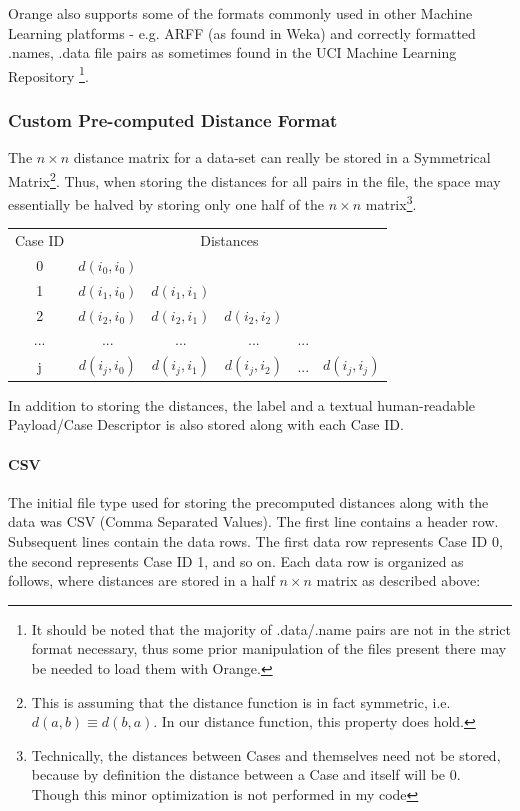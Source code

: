 \documentclass[a4paper,11pt]{report}
\begin{document}
Orange also supports some of the formats commonly used in other Machine Learning platforms - e.g. ARFF (as found in Weka) and correctly formatted .names, .data file pairs as sometimes found in the UCI Machine Learning Repository \citep{web:uci}\footnote{It should be noted that the majority of .data/.name pairs are not in the strict format necessary, thus some prior manipulation of the files present there may be needed to load them with Orange.}.

\subsubsection{Custom Pre-computed Distance Format}

The $n \times n$ distance matrix for a data-set can really be stored in a Symmetrical Matrix\footnote{This is assuming that the distance function is in fact symmetric, i.e. $d(a, b)\equiv d(b, a)$. In our distance function, this property does hold.}. Thus, when storing the distances for all pairs in the file, the space may essentially be halved by storing only one half of the $n \times n$ matrix\footnote{Technically, the distances between Cases and themselves need not be stored, because by definition the distance between a Case and itself will be 0. Though this minor optimization is not performed in my code}.

\medskip

\begin{tabular}{ c c c c c c }
	Case ID & \multicolumn{5}{c}{Distances} \\
	0 & $d(i_{0},i_{0})$ &  &  &  & \\
	1 & $d(i_{1},i_{0})$ & $d(i_{1},i_{1})$ &  &  &  \\
	2 & $d(i_{2},i_{0})$ & $d(i_{2},i_{1})$ & $d(i_{2},i_{2})$ &  & \\ 
	... & ... & ... & ... & ... & \\ 
	j & $d(i_{j},i_{0})$ & $d(i_{j},i_{1})$ & $d(i_{j},i_{2})$ & ... & $d(i_{j},i_{j})$ \\ 
\end{tabular}

\medskip

In addition to storing the distances, the label and a textual human-readable Payload/Case Descriptor is also stored along with each Case ID.

\paragraph{CSV}
The initial file type used for storing the precomputed distances along with the data was CSV (Comma Separated Values). The first line contains a header row. Subsequent lines contain the data rows. The first data row represents Case ID 0, the second represents Case ID 1, and so on. Each data row is organized as follows, where distances are stored in a half $n \times n$ matrix as described above:
\medskip
\end{document}
